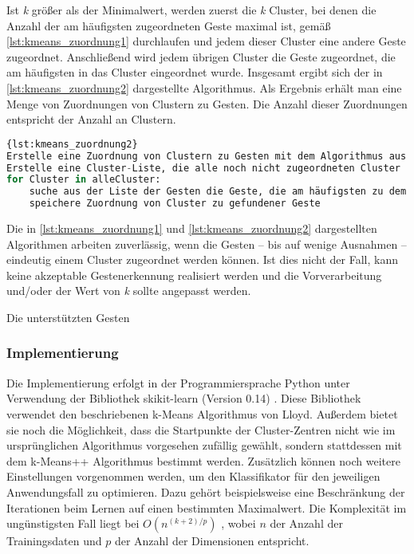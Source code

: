 Ist \emph{k} größer als der Minimalwert, werden zuerst die \emph{k} Cluster, bei denen die Anzahl der am häufigsten zugeordneten Geste maximal ist, gemäß 
\autoref{lst:kmeans_zuordnung1} durchlaufen und jedem dieser Cluster eine andere Geste zugeordnet. Anschließend wird jedem übrigen Cluster die Geste zugeordnet, die am häufigsten in das Cluster eingeordnet wurde.
Insgesamt ergibt sich der in \autoref{lst:kmeans_zuordnung2} dargestellte Algorithmus.  Als Ergebnis erhält man eine Menge von Zuordnungen von Clustern zu Gesten. Die Anzahl dieser Zuordnungen entspricht der Anzahl an Clustern.

\begin{lstlisting}[language=Python,caption={Pseudocode der Zuordnung von Cluster-Zentren zu Gesten, Variante 2},label={lst:kmeans_zuordnung2}]{lst:kmeans_zuordnung2}
Erstelle eine Zuordnung von Clustern zu Gesten mit dem Algorithmus aus Quelltext 4.1
Erstelle eine Cluster-Liste, die alle noch nicht zugeordneten Cluster       enthält
for Cluster in alleCluster:
    suche aus der Liste der Gesten die Geste, die am häufigsten zu dem Cluster zugeordnet wird
    speichere Zuordnung von Cluster zu gefundener Geste
\end{lstlisting}

Die in \autoref{lst:kmeans_zuordnung1} und \autoref{lst:kmeans_zuordnung2} dargestellten Algorithmen arbeiten
zuverlässig, wenn die Gesten -- bis auf wenige Ausnahmen -- eindeutig einem Cluster zugeordnet werden können. Ist dies nicht der Fall, kann keine akzeptable Gestenerkennung realisiert werden und die Vorverarbeitung und/oder der Wert von \emph{k} sollte angepasst werden.

Die unterstützten Gesten

\subsubsection{Implementierung} \label{subsubsec:kMeansImpl}
Die Implementierung erfolgt in der Programmiersprache Python unter Verwendung der Bibliothek skikit-learn (Version 0.14) \cite{sklearn}. Diese Bibliothek verwendet den beschriebenen k-Means Algorithmus von Lloyd. Außerdem bietet sie noch die Möglichkeit, dass die Startpunkte der Cluster-Zentren nicht wie im ursprünglichen Algorithmus vorgesehen zufällig gewählt, sondern stattdessen mit dem k-Means++ Algorithmus bestimmt werden. Zusätzlich können noch weitere 
Einstellungen vorgenommen werden, um den Klassifikator für den jeweiligen Anwendungsfall  zu optimieren. Dazu gehört beispielsweise eine Beschränkung der Iterationen beim Lernen auf einen bestimmten Maximalwert.
Die Komplexität im ungünstigsten Fall liegt bei $O(n^{(k+2)/p})$ \cite{sklearn.kmeans, kMeansHowSlow}, wobei $n$ der Anzahl der Trainingsdaten und $p$ der Anzahl der Dimensionen entspricht.

